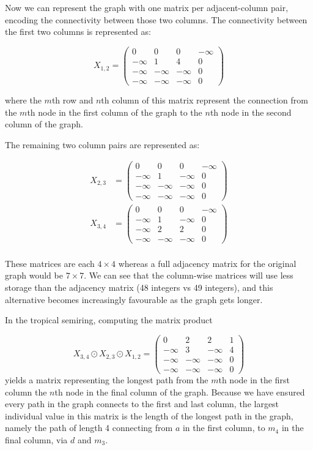 Now we can represent the graph with one matrix per adjacent-column pair, encoding the connectivity between those two
columns. The connectivity between the first two columns is represented as:

\[
  X_{1,2} = 
  \begin{pmatrix}
  0 & 0 & 0 & -\infty \\
  -\infty & 1 & 4 & 0 \\
  -\infty & -\infty & -\infty & 0 \\
  -\infty & -\infty & -\infty & 0 
  \end{pmatrix}
\]

where the $m$th row and $n$th column of this matrix represent the connection from the $m$th node in the first column of 
the graph to the $n$th node in the second column of the graph.

The remaining two column pairs are represented as:

\[
  \begin{aligned}
    X_{2,3} &= 
    \begin{pmatrix}
    0 & 0 & 0 & -\infty \\
    -\infty & 1 & -\infty & 0 \\
    -\infty & -\infty & -\infty & 0 \\
    -\infty & -\infty & -\infty & 0 
    \end{pmatrix} \\
    X_{3,4} &= 
    \begin{pmatrix}
    0 & 0 & 0 & -\infty \\
    -\infty & 1 & -\infty & 0 \\
    -\infty & 2 & 2 & 0 \\
    -\infty & -\infty & -\infty & 0 
    \end{pmatrix}\\
  \end{aligned}
\]

These matrices are each $4 \times 4$ whereas a full adjacency matrix for the original graph would be $7 \times 7$.
We can see that the column-wise matrices will use less storage than the adjacency matrix (48 integers vs 49 integers),
and this alternative becomes increasingly favourable as the graph gets longer.


In the tropical semiring, computing the matrix product

\[
  X_{3,4} \odot X_{2,3} \odot X_{1,2} = \begin{pmatrix}
  0 & 2 & 2 & 1 \\
  -\infty & 3 & -\infty & 4 \\
  -\infty & -\infty & -\infty & 0 \\
  -\infty & -\infty & -\infty & 0 
\end{pmatrix}
\]
yields a matrix representing the longest path from the $m$th node in the first column the $n$th node in the final 
column of the graph. Because we have ensured every path in the graph connects to the first and last column, the largest 
individual value in this matrix is the length of the longest path in the graph, namely the path of length 4 connecting 
from $a$ in the first column, to $m_4$ in the final column, via $d$ and $m_3$.

